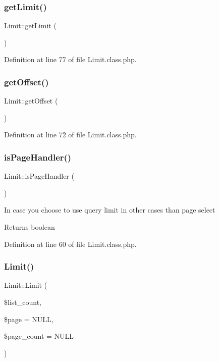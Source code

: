 \subsubsection{\texorpdfstring{get\+Limit()}{getLimit()}}
{\footnotesize\ttfamily Limit\+::get\+Limit (\begin{DoxyParamCaption}{ }\end{DoxyParamCaption})}



Definition at line 77 of file Limit.\+class.\+php.

\mbox{\label{classLimit_a5dfd9d778f1cfbdaee6114f707a82b48}} 
\subsubsection{\texorpdfstring{get\+Offset()}{getOffset()}}
{\footnotesize\ttfamily Limit\+::get\+Offset (\begin{DoxyParamCaption}{ }\end{DoxyParamCaption})}



Definition at line 72 of file Limit.\+class.\+php.

\mbox{\label{classLimit_a3a30a3752791c509c01ee9b52e774a3c}} 
\subsubsection{\texorpdfstring{is\+Page\+Handler()}{isPageHandler()}}
{\footnotesize\ttfamily Limit\+::is\+Page\+Handler (\begin{DoxyParamCaption}{ }\end{DoxyParamCaption})}

In case you choose to use query limit in other cases than page select \begin{DoxyReturn}{Returns}
boolean 
\end{DoxyReturn}


Definition at line 60 of file Limit.\+class.\+php.

\mbox{\label{classLimit_a45e8c675dc77b863b87590c76b4113ad}} 
\subsubsection{\texorpdfstring{Limit()}{Limit()}}
{\footnotesize\ttfamily Limit\+::\+Limit (\begin{DoxyParamCaption}\item[{}]{\$list\+\_\+count,  }\item[{}]{\$page = {\ttfamily NULL},  }\item[{}]{\$page\+\_\+count = {\ttfamily NULL} }\end{DoxyParamCaption})}

